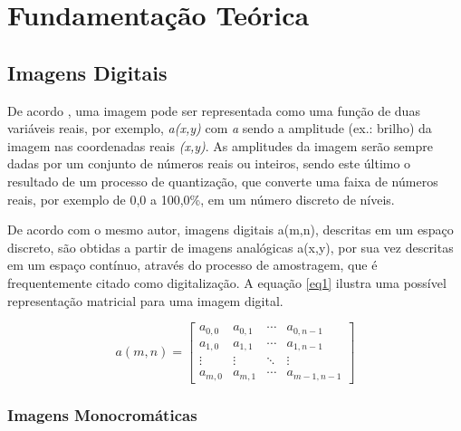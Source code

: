 \chapter[Fundamentação Teórica]{Fundamentação Teórica}

\section{Imagens Digitais}

De acordo , uma imagem pode ser representada como uma função de duas variáveis reais, por exemplo, \textit{a(x,y)} com \textit{a} sendo a amplitude (ex.: brilho) da imagem nas coordenadas reais \textit{(x,y)}. As amplitudes da imagem serão sempre dadas por um conjunto de números reais ou inteiros, sendo este último o resultado de um processo de quantização, que converte uma faixa de números reais, por exemplo de 0,0 a 100,0\%, em um número discreto de níveis.

De acordo com o mesmo autor, imagens digitais a(m,n), descritas em um espaço discreto, são obtidas a partir de imagens analógicas a(x,y), por sua vez descritas em um espaço contínuo,  através do processo de amostragem, que é frequentemente citado como digitalização. A equação \ref{eq1} ilustra uma possível representação matricial para uma imagem digital.
\vspace{-1cm}
\begin{center}
	\begin{equation}
	a(m,n) =
	\begin{bmatrix}
  		a_{0,0} & a_{0,1} & \cdots & a_{0,n-1} \\
  		a_{1,0} & a_{1,1} & \cdots & a_{1,n-1} \\
  		\vdots  & \vdots  & \ddots & \vdots  \\
  		a_{m,0} & a_{m,1} & \cdots & a_{m-1,n-1}
	\end{bmatrix}
	\label{eq1} 
	\end{equation}
\end{center}
\subsection{Imagens Monocromáticas}
	

